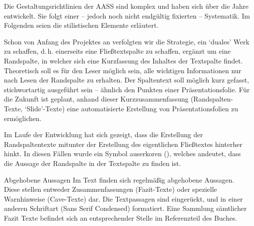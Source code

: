 \documentclass[
ngerman,
paper=a4,
asymmetric,
fontsize=10pt,
draft=false,
numbers=noenddot,
bibtotocnumbered,
footnotes=multiple,
toc=flat,
]{scrbook}
\begin{document}
Die Gestaltungsrichtlinien der AASS sind komplex und
haben sich über die Jahre entwickelt. Sie folgt einer --
jedoch noch nicht endgültig fixierten -- Systematik. Im
Folgenden seien die stilistischen Elemente erläutert.

Schon von Anfang des Projektes an verfolgten wir die
Strategie, ein \enquote*{duales} Werk zu schaffen,
d.\,h. einerseits eine Fließtextspalte zu
schaffen, ergänzt um eine Randspalte, in welcher sich eine
Kurzfassung des Inhaltes der Textspalte findet. 
Theoretisch soll es für den Leser möglich sein, alle
wichtigen Informationen nur nach Lesen der Randspalte
zu erhalten. Der Spaltentext soll möglich kurz
gefasst, stichwortartig ausgeführt sein -- ähnlich den Punkten
einer Präsentationsfolie. Für die Zukunft ist geplant,
anhand dieser Kurzzusammenfassung (Randspalten-Texte,
\enquote*{Slide}-Texte) eine automatisierte
Erstellung von Präsentationsfolien zu
ermöglichen. 

Im Laufe der Entwicklung hat sich 
gezeigt, dass die Erstellung der Randspaltentexte mitunter der
Erstellung des eigentlichen Fließtextes hinterher hinkt. In
diesen Fällen wurde ein Symbol auserkoren (\SymbolText), welches andeutet, dass die
Aussage der Randspalte in der Textspalte zu finden ist.


\Text
{Abgehobene Aussagen}
{Im Text finden sich regelmäßig abgehobene Aussagen. Diese
stellen entweder Zusammenfassungen (Fazit-Texte) oder
spezielle Warnhinweise (Cave-Texte) dar. Die Textpassagen
sind eingerückt, und in einer anderen Schriftart (Sans Serif Condensed) formatiert. Eine Sammlung sämtlicher Fazit
Texte befindet sich an entsprechender Stelle im Referenzteil
des Buches.}
{}
{}
{}
{}
\end{document}
